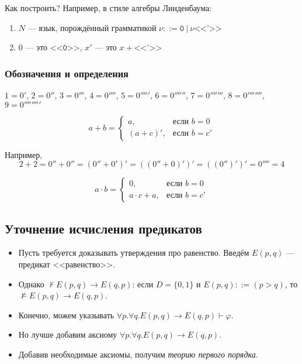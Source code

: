 Как построить? Например, в стиле алгебры Линденбаума:
\begin{enumerate}
\item $N$ --- язык, порождённый грамматикой $\nu ::= \texttt{0}\ |\ \nu \texttt{<<'>>}$
\item $0$ --- это $\texttt{<<0>>}$, $x'$ --- это $x + \texttt{<<'>>}$
\end{enumerate}


\subsubsection{Обозначения и определения}

$1 = 0'$, $2 = 0''$, $3 = 0'''$, $4 = 0''''$, $5 = 0'''''$, $6 = 0''''''$,
$7 = 0'''''''$, $8 = 0''''''''$, $9 = 0'''''''''$


$$a + b = \left\{ \begin{array}{ll} a, & \mbox{если } b = 0\\
                                    (a + c)', & \mbox{если } b = c'
                  \end{array}\right.$$

Например, $$2 + 2 = 0'' + 0'' = (0'' + 0')' = ((0'' + 0)')' = ((0'')')' = 0'''' = 4$$

$$a \cdot b = \left\{ \begin{array}{ll} 0, & \mbox{если } b = 0\\
                                    a \cdot c + a, & \mbox{если } b = c'
                  \end{array}\right.$$



\subsection{Уточнение исчисления предикатов}

\begin{itemize}
\item Пусть требуется доказывать утверждения про равенство. Введём $E(p,q)$ --- предикат <<равенство>>.
\item Однако $\not\vdash E(p,q)\to E(q,p)$: если $D = \{0,1\}$ и $E(p,q) ::= (p>q)$,
то $\not\models E(p,q)\to E(q,p)$.
\item Конечно, можем указывать $\forall p.\forall q.E(p,q)\to E(q,p) \vdash \varphi$.
\item Но лучше добавим аксиому $\forall p.\forall q.E(p,q)\to E(q,p)$.
\item Добавив необходимые аксиомы, получим \emph{теорию первого порядка}.
\end{itemize}

